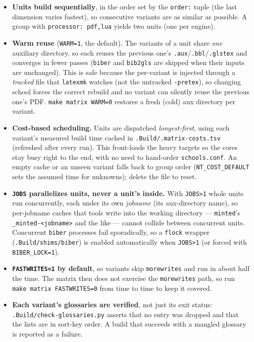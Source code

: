 \begin{itemize}
  \item \textbf{Units build sequentially}, in the order set by the
        \texttt{order:} tuple (the last dimension varies fastest), so
        consecutive variants are as similar as possible.  A group with
        \texttt{processor: pdf,lua} yields two units (one per engine).

  \item \textbf{Warm reuse} (\texttt{WARM=1}, the default).  The variants of a
        unit share \emph{one} auxiliary directory, so each reuses the previous
        one's \texttt{.aux}/\texttt{.bbl}/\texttt{.glstex} and converges in
        fewer passes (\texttt{biber} and \texttt{bib2gls} are skipped when
        their inputs are unchanged).  This is safe because the per-variant
        \latexinline{\ntoverride} is injected through a \emph{tracked} file
        that \texttt{latexmk} watches (not the untracked \verb!-pretex!), so
        changing school forces the correct rebuild and no variant can silently
        reuse the previous one's \gls{PDF}.  \verb!make matrix WARM=0! restores
        a fresh (cold) aux directory per variant.

  \item \textbf{Cost-based scheduling.}  Units are dispatched
        \emph{longest-first}, using each variant's measured build time cached
        in \verb!.Build/.matrix-costs.tsv! (refreshed after every run).  This
        front-loads the heavy targets so the cores stay busy right to the end,
        with no need to hand-order \texttt{schools.conf}.  An empty cache or an
        unseen variant falls back to group order (\verb!NT_COST_DEFAULT! sets
        the assumed time for unknowns); delete the file to reset.

  \item \textbf{\texttt{JOBS} parallelizes units, never a unit's inside.}
        With \verb!JOBS>1! whole units run concurrently, each under its own
        \emph{jobname} (its aux-directory name), so per-jobname caches that
        tools write into the working directory --- \texttt{minted}'s
        \verb!_minted-<jobname>! and the like --- cannot collide between
        concurrent units.  Concurrent \texttt{biber} processes fail
        sporadically, so a \texttt{flock} wrapper (\verb!.Build/shims/biber!)
        is enabled automatically when \verb!JOBS>1! (or forced with
        \verb!BIBER_LOCK=1!).

  \item \textbf{\texttt{FASTWRITES=1} by default}, so 
        variants skip \texttt{morewrites} and run in about half the time.  The
        matrix then does not exercise the \texttt{morewrites} path, so run
        \verb!make matrix FASTWRITES=0! from time to time to keep it covered.

  \item \textbf{Each variant's glossaries are verified}, not just its exit
        status: \verb!.Build/check-glossaries.py! asserts that no entry was
        dropped and that the lists are in sort-key order.  A build that
        succeeds with a mangled glossary is reported as a failure.
\end{itemize}

